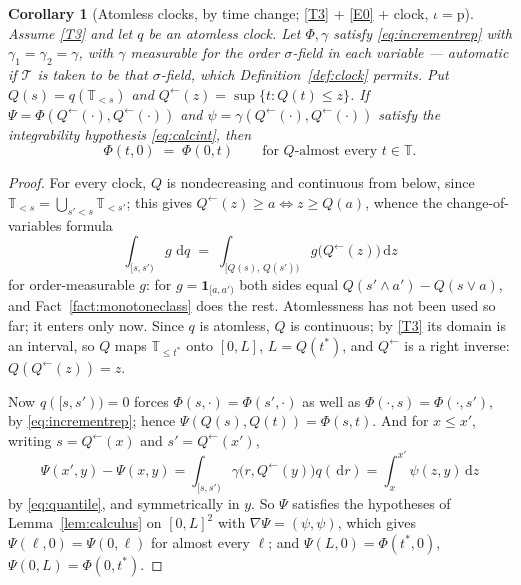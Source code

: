 \documentclass[11pt,a4paper]{article}
\theoremstyle{plain}
\newtheorem{corollary}[theorem]{Corollary}
\theoremstyle{definition}
\theoremstyle{remark}
\newcommand{\T}{\mathbb{T}}                     %
\newcommand{\one}{\mathbf{1}}
\newcommand{\dif}{\,\mathrm{d}}
\begin{document}
\begin{corollary}[Atomless clocks, by time change; \eqref{T3} + \eqref{E0} + clock, $\iota = \mathrm{p}$]
  \label{cor:atomless}
  Assume \eqref{T3} and let $q$ be an \emph{atomless} clock.  Let $\Phi,\gamma$ satisfy
  \eqref{eq:incrementrep} with $\gamma_1 = \gamma_2 = \gamma$, with $\gamma$
  measurable for the order $\sigma$-field in each variable --- automatic if
  $\mathcal{T}$ is taken to be that $\sigma$-field, which
  Definition~\ref{def:clock} permits.  Put $Q(s) = q(\T_{<s})$ and
  $Q^{\leftarrow}(z) = \sup\{t : Q(t) \leq z\}$.  If
  $\Psi = \Phi(Q^{\leftarrow}(\cdot),Q^{\leftarrow}(\cdot))$ and $\psi = \gamma(Q^{\leftarrow}(\cdot),Q^{\leftarrow}(\cdot))$
  satisfy the integrability hypothesis \eqref{eq:calcint}, then
  \[
    \Phi(t,0) \;=\; \Phi(0,t)
    \qquad\text{for $Q$-almost every } t \in \T .
  \]
\end{corollary}

\begin{proof}
  For every clock, $Q$ is nondecreasing and continuous from below, since
  $\T_{<s} = \bigcup_{s' < s} \T_{<s'}$; this gives
  $Q^{\leftarrow}(z) \geq a \iff z \geq Q(a)$, whence the change-of-variables formula
  \begin{equation}
    \label{eq:quantile}
    \int_{[s,s')} g \, \dif q
      \;=\; \int_{[Q(s),\,Q(s'))} g\bigl(Q^{\leftarrow}(z)\bigr) \dif z
  \end{equation}
  for order-measurable $g$: for $g = \one_{[a,a')}$ both sides equal
  $Q(s'\wedge a') - Q(s\vee a)$, and Fact~\ref{fact:monotoneclass} does the rest.
  Atomlessness has not been used so far; it enters only now.  Since $q$ is
  atomless, $Q$ is continuous; by \eqref{T3} its domain is an interval, so $Q$ maps
  $\T_{\leq t^*}$ onto $[0,L]$, $L = Q(t^*)$, and $Q^{\leftarrow}$ is a right
  inverse: $Q(Q^{\leftarrow}(z)) = z$.

  Now $q([s,s')) = 0$ forces $\Phi(s,\cdot) = \Phi(s',\cdot)$ as well as
  $\Phi(\cdot,s) = \Phi(\cdot,s')$, by \eqref{eq:incrementrep}; hence
  $\Psi(Q(s),Q(t)) = \Phi(s,t)$.  And for $x \leq x'$, writing
  $s = Q^{\leftarrow}(x)$ and $s' = Q^{\leftarrow}(x')$,
  \[
    \Psi(x',y) - \Psi(x,y)
      = \int_{[s,s')} \gamma\bigl(r,Q^{\leftarrow}(y)\bigr) q(\dif r)
      = \int_x^{x'} \psi(z,y) \dif z
  \]
  by \eqref{eq:quantile}, and symmetrically in $y$.  So $\Psi$ satisfies the
  hypotheses of Lemma~\ref{lem:calculus} on $[0,L]^2$ with
  $\nabla\Psi = (\psi,\psi)$, which gives $\Psi(\ell,0) = \Psi(0,\ell)$ for
  almost every $\ell$; and $\Psi(L,0) = \Phi(t^*,0)$,
  $\Psi(0,L) = \Phi(0,t^*)$.
\end{proof}
\end{document}
